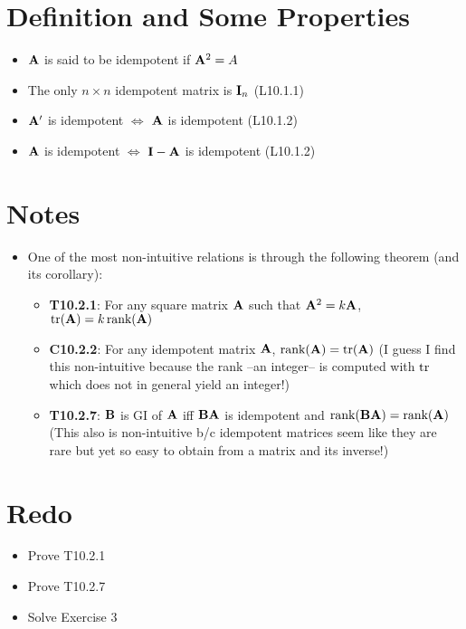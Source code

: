 \documentclass[a4paper, oneside]{book}
\begin{document}
\section*{Definition and Some Properties}
\begin{itemize}
\item $\mathbf A$ is said to be idempotent if $\mathbf A^2 = A$
\item The only $n\times n$ idempotent matrix is $\mathbf I_n$ (L10.1.1)
\item $\mathbf A'$ is idempotent $\iff$ $\mathbf A$ is idempotent (L10.1.2)
\item $\mathbf A$ is idempotent $\iff$ $\mathbf{I-A}$ is idempotent (L10.1.2)
\end{itemize}

\section*{Notes}
\begin{itemize}
\item One of the most non-intuitive relations is through the following theorem (and its corollary):
	\begin{itemize}
	\item \textbf{T10.2.1}: For any square matrix $\mathbf A$ such that $\mathbf A^2=k \mathbf A$, $\text{tr}(\mathbf A) = k\, \text{rank}(\mathbf A)$
	\item \textbf{C10.2.2}: For any idempotent matrix $\mathbf A$, $\text{rank}(\mathbf A) = \text{tr}(\mathbf A)$ (I guess I find this non-intuitive because the rank \---an integer\--- is computed with $\text{tr}$ which does not in general yield an integer!)
	\item \textbf{T10.2.7}: $\mathbf B$ is GI of $\mathbf A$ iff $\mathbf{BA}$ is idempotent and $\text{rank}(\mathbf {BA}) = \text{rank}(\mathbf A)$ (This also is non-intuitive b/c idempotent matrices seem like they are rare but yet so easy to obtain from a matrix and its inverse!)
	\end{itemize}
\end{itemize}


\section*{Redo}
\begin{itemize}
\item Prove T10.2.1
\item Prove T10.2.7
\item Solve Exercise 3
\end{itemize}
\end{document}
